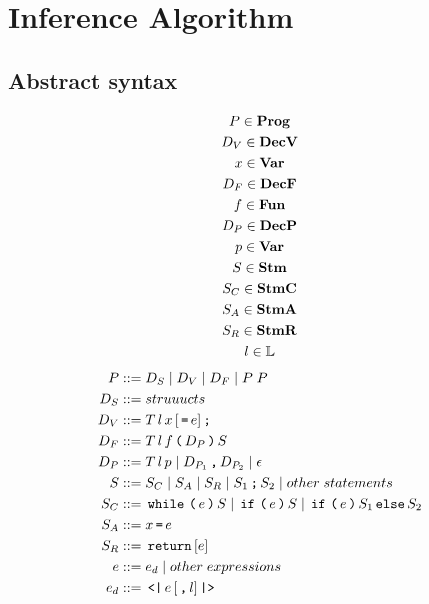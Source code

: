 
\section{Inference Algorithm}

\subsection{Abstract syntax}

\begin{gather*}
  P \in \mathbf{Prog}\\
  D_V \in \mathbf{DecV}\\
  x \in \mathbf{Var}\\
  D_F \in \mathbf{DecF} \\
  f \in \mathbf{Fun}\\
  D_P \in \mathbf{DecP}\\
  p \in \mathbf{Var}\\
  S \in \mathbf{Stm}\\
  S_C \in \mathbf{StmC}\\
  S_A \in \mathbf{StmA}\\
  S_R \in \mathbf{StmR}\\
  l \in \mathbb{L}\\
\end{gather*}
\begin{align*}
  P       & ::= D_S \gp D_V \gp D_F \gp P \; P \\
  D_S     & ::= struuucts\\
  D_V     & ::= T \, l \, x \, [\tk = e] \tk ; \\
  D_F     & ::= T \, l \, f \tk ( D_P \tk ) S \\
  D_P     & ::= T \, l \, p \gp D_{P_1} \tk , D_{P_2} \gp \epsilon \\
  S       & ::= S_C \gp S_A \gp S_R \gp S_1 \tk ; S_2 \gp other \; statements \\
  S_C     & ::= \tk{while} \tk ( e \tk ) S \gp \tk{if} \tk ( e \tk ) S \gp \tk{if} \tk ( e \tk ) S_1 \tk{else} S_2 \\
  S_A     & ::= x \tk = e \\
  S_R     & ::= \tk{return} [e] \\
  e       & ::= e_d \gp other \; expressions \\
  e_d     & ::= \tk{<|} e \, [\tk , l] \tk{|>}
\end{align*}

